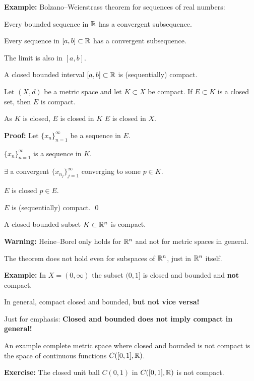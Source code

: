 \documentclass[10pt,aspectratio=169]{beamer}
\begin{document}
\begin{frame}

\textbf{Example:}
Bolzano--Weierstrass theorem for sequences of real numbers:

Every bounded sequence in ${\mathbb{R}}$ has a convergent subsequence.

\pause
\thus \quad Every sequence in $[a,b] \subset {\mathbb{R}}$ has 
a convergent subsequence.

\pause
\thus \quad The limit is also in $[a,b]$.

\pause
\thus \quad A closed bounded interval $[a,b] \subset {\mathbb{R}}$ is (sequentially) compact.

\pause
\begin{proposition}
Let $(X,d)$ be a metric space and let $K \subset X$ be compact.  If
$E \subset K$ is a closed set, then $E$ is compact.
\end{proposition}

\pause
As $K$ is closed, $E$ is closed in $K$ \wiffif
$E$ is closed in $X$.

\pause
\medskip

\textbf{Proof:}
Let $\{ x_n \}_{n=1}^\infty$ be a sequence in $E$.

\pause
$\{ x_n \}_{n=1}^\infty$ is a sequence in $K$.

\pause
\thus \quad $\exists$ a convergent $\{ x_{n_j} \}_{j=1}^\infty$ converging
to some $p \in K$.

\pause
$E$ is closed \wthus $p \in E$.

\pause
\thus \quad $E$ is (sequentially) compact.
\qed

\end{frame}

\begin{frame}

\begin{theorem}
A closed bounded subset $K \subset {\mathbb{R}}^n$ is compact.
\end{theorem}

\pause
\textbf{Warning:}
Heine--Borel only holds for ${\mathbb{R}}^n$ and not for metric spaces in general.

\pause
The theorem does not hold even for subspaces of ${\mathbb{R}}^n$, just in ${\mathbb{R}}^n$
itself.

\pause
\medskip

\textbf{Example:} In $X = (0,\infty)$ the subset $(0,1]$ is closed and
bounded and \textbf{not} compact.

\pause
\medskip

In general, compact \wthus closed and bounded, \textbf{but not vice versa!}

\pause
\medskip

Just for emphasis:
\textbf{Closed and bounded does not imply compact in general!}

\medskip
\pause

An example complete metric space where closed and bounded is not
compact is the space of continuous functions $C([0,1],{\mathbb{R}})$.

\medskip
\pause

\textbf{Exercise:} The closed unit ball $C(0,1)$ in $C([0,1],{\mathbb{R}})$ is not compact.

\end{frame}
\end{document}
